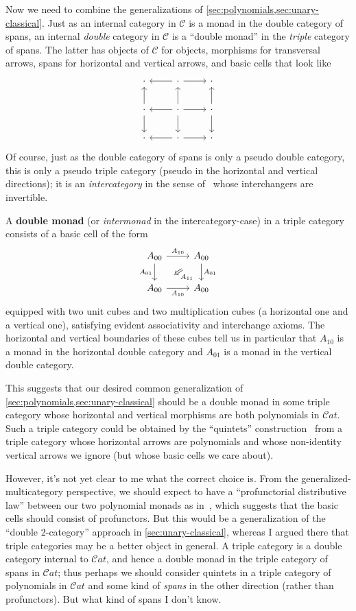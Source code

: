 \documentclass{article}
\theoremstyle{definition}
\def\Cat{\mathcal{C}\mathit{at}}
\def\sC{\mathscr{C}}
\def\twocell#1#2#3{\ar[from=#1,to=#2,phantom,""{name=1,near start},""{name=2,near end}]\ar[Rightarrow,from=1,to=2,"#3"]}
\def\drtwocell{\twocell{r}{d}}
\begin{document}
Now we need to combine the generalizations of \cref{sec:polynomials,sec:unary-classical}.
Just as an internal category in $\sC$ is a monad in the double category of spans, an internal \emph{double} category in $\sC$ is a ``double monad'' in the \emph{triple} category of spans.
The latter has objects of $\sC$ for objects, morphisms for transversal arrows, spans for horizontal and vertical arrows, and basic cells that look like
\[
\begin{tikzcd}
  \cdot & \cdot \ar[l] \ar[r] & \cdot \\
  \cdot \ar[u] \ar[d] & \cdot \ar[u] \ar[d] \ar[r] \ar[l] & \cdot \ar[u] \ar[d]\\
  \cdot & \cdot \ar[l] \ar[r] & \cdot
\end{tikzcd}
\]
Of course, just as the double category of spans is only a pseudo double category, this is only a pseudo triple category (pseudo in the horizontal and vertical directions); it is an \emph{intercategory} in the sense of~\cite{gp:intercategories-i,gp:intercategories-ii} whose interchangers are invertible.

A \textbf{double monad} (or \emph{intermonad} in the intercategory-case) in a triple category consists of a basic cell of the form
\[
\begin{tikzcd}
  A_{00} \ar[r,"{A_{10}}"] \ar[d,swap,"{A_{01}}"] \drtwocell{A_{11}} & A_{00} \ar[d,"{A_{01}}"]\\
  A_{00} \ar[r,swap,"{A_{10}}"] & A_{00}
\end{tikzcd}
\]
equipped with two unit cubes and two multiplication cubes (a horizontal one and a vertical one), satisfying evident associativity and interchange axioms.
The horizontal and vertical boundaries of these cubes tell us in particular that $A_{10}$ is a monad in the horizontal double category and $A_{01}$ is a monad in the vertical double category.

This suggests that our desired common generalization of \cref{sec:polynomials,sec:unary-classical} should be a double monad in some triple category whose horizontal and vertical morphisms are both polynomials in $\Cat$.
Such a triple category could be obtained by the ``quintets'' construction~\cite{pare:isotropic-intercats} from a triple category whose horizontal arrows are polynomials and whose non-identity vertical arrows we ignore (but whose basic cells we care about).

However, it's not yet clear to me what the correct choice is.
From the generalized-multicategory perspective, we should expect to have a ``profunctorial distributive law'' between our two polynomial monads as in~\cite{garner:polycats}, which suggests that the basic cells should consist of profunctors.
But this would be a generalization of the ``double 2-category'' approach in \cref{sec:unary-classical}, whereas I argued there that triple categories may be a better object in general.
A triple category is a double category internal to $\Cat$, and hence a double monad in the triple category of spans in $\Cat$; thus perhaps we should consider quintets in a triple category of polynomials in $\Cat$ and some kind of \emph{spans} in the other direction (rather than profunctors).
But what kind of spans I don't know.




\end{document}
